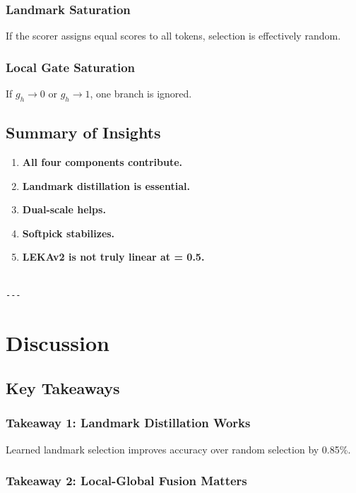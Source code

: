 \subsubsection{Landmark Saturation}

If the scorer assigns equal scores to all tokens, selection is effectively 
random.

\subsubsection{Local Gate Saturation}

If $g_h \to 0$ or $g_h \to 1$, one branch is ignored.

\subsection{Summary of Insights}

\begin{enumerate}
\item \textbf{All four components contribute.}
\item \textbf{Landmark distillation is essential.}
\item \textbf{Dual-scale helps.}
\item \textbf{Softpick stabilizes.}
\item \textbf{LEKAv2 is not truly linear at   = 0.5.}
\end{enumerate}
\begin{lstlisting}

---
\end{lstlisting}

\section{Discussion}

\subsection{Key Takeaways}

\subsubsection{Takeaway 1: Landmark Distillation Works}

Learned landmark selection improves accuracy over random selection by 
0.85\%.

\subsubsection{Takeaway 2: Local-Global Fusion Matters}

